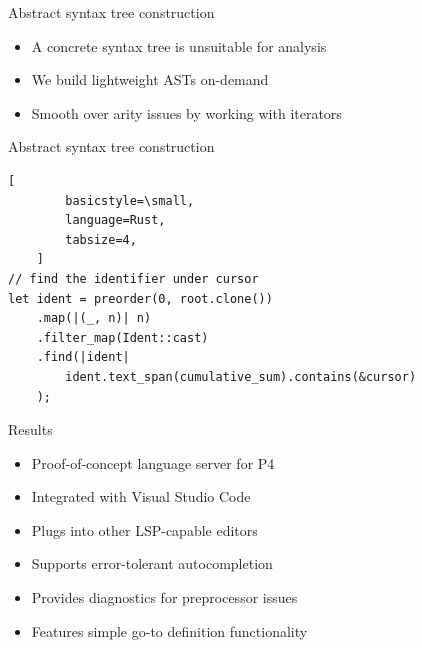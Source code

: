 \documentclass[aspectratio=169]{beamer}
\begin{document}
\begin{frame}{Abstract syntax tree construction}
	\begin{itemize}
		\item A concrete syntax tree is unsuitable for analysis \pause
		\item We build lightweight ASTs on-demand \pause
		\item Smooth over arity issues by working with \alert{iterators}
		\vspace{0.5cm}
		\begin{center}
		\end{center}
	\end{itemize}
\end{frame}

\begin{frame}[fragile]{Abstract syntax tree construction}
	\begin{lstlisting}[
		basicstyle=\small,
		language=Rust,
		tabsize=4,
	]
// find the identifier under cursor
let ident = preorder(0, root.clone())
	.map(|(_, n)| n)
	.filter_map(Ident::cast)
	.find(|ident|
		ident.text_span(cumulative_sum).contains(&cursor)
	);
	\end{lstlisting}
\end{frame}

\begin{frame}{Results}
	\begin{itemize}
		\item Proof-of-concept language server for P4 \pause
		\item Integrated with Visual Studio Code \pause
		\item Plugs into other LSP-capable editors \pause
		\item Supports \alert{error-tolerant autocompletion} \pause
		\item Provides diagnostics for preprocessor issues \pause
		\item Features simple go-to definition functionality
	\end{itemize}
\end{frame}
\end{document}
